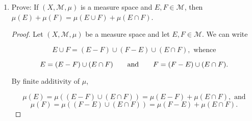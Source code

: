 \documentclass[11pt,oneside,english]{amsart}
\theoremstyle{definition}
\newcommand{\aspace}{\hspace{7mm}\text{and}\hspace{7mm}}
\newcommand{\lom}[2]{\lim_{{#1}\rightarrow{#2}}}
\newcommand{\MC}[1]{\mathcal{#1}}
\begin{document}
\begin{enumerate}
\begin{proof}
Write $\displaystyle F_k=\bigcap_{j=k}^\infty E_j$. Then $F_{k+1}\supset F_k$ so by continuity from below, we have

\[
\mu(\liminf E_j)=\mu\left(\bigcup_{k=1}^\infty\bigcap_{j=k}^\infty E_j\right)=\mu\left(\bigcup_{k=1}^\infty F_k\right)=\lom{k}{\infty}\mu(F_k).
\]

Now, $F_k\subset E_j$ for all $k\geq j$ so by monotonicity we have $\mu(F_k)\leq\mu(E_j)$ for all $k\geq j$, whence $\mu(F_k)\leq\inf_{k\geq j} \mu(E_j)$ by the definition of infimum. Therefore,

\[
\lom{k}{\infty}\mu(F_k)\leq\lim \inf_{k\geq j}\mu(E_j)=\liminf \mu(E_j).
\]

This result combined with the previous equality above yields

\[
\mu(\liminf E_j)\leq \liminf \mu(E_j).
\]


Next, suppose that  $\displaystyle \mu\left(\bigcup_1^\infty E_j \right)<\infty$. Let $\displaystyle F_k=\bigcup_{j=k}^\infty E_j$. Then $F_{k+1}\subset F_k$ so by continuity from above, we have

\[
\mu(\limsup E_j)=\mu\left(\bigcap_{k=1}^\infty\bigcup_{j=k}^\infty E_j\right)=\mu\left(\bigcap_{k=1}^\infty F_k\right)=\lom{k}{\infty}\mu(F_k).
\]


Now, $F_k\supset E_j$ for all $k\geq j$, whence $\mu(F_k)\geq\sup_{k\geq j}\mu(E_j)$. Therefore,

\[
\lom{k}{\infty}\mu(F_k)\geq\lim \sup_{k\geq j}\mu(E_j)=\limsup\mu(E_j).
\]

This result combined with the previous equality above yields

\[
\mu(\limsup E_j)\geq \limsup\mu(E_j).
\]

\end{proof}

\item Prove: If $(X,\MC{M}, \mu)$ is a measure space and $E,F\in\MC{M}$, then $\mu(E)+\mu(F)=\mu(E\cup F)+\mu(E\cap F)$.

\begin{proof}

Let  $(X,\MC{M}, \mu)$ be a measure space and let $E,F\in\MC{M}$. We can write

\[
E\cup F=(E-F)\cup(F-E)\cup(E\cap F),\text{ whence}
\]

\[
E=(E-F)\cup(E\cap F) \aspace F=(F-E)\cup(E\cap F).
\]

By finite additivity of $\mu$,

\[
\mu(E)=\mu((E-F)\cup(E\cap F))=\mu(E-F)+\mu(E\cap F),\text{ and}
\]
\[
\mu(F)=\mu((F-E)\cup(E\cap F))=\mu(F-E)+\mu(E\cap F).
\]


\end{proof}
\end{enumerate}
\end{document}
